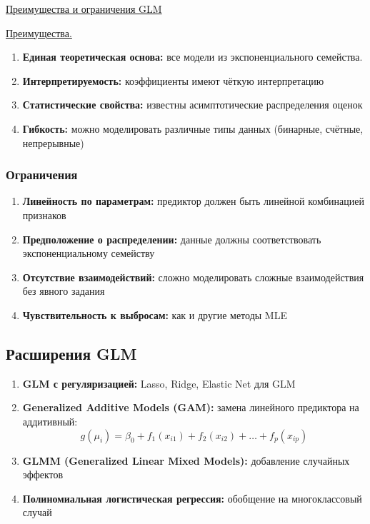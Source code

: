 \underline{Преимущества и ограничения GLM}

\underline{Преимущества.}

\begin{enumerate}
    \item \textbf{Единая теоретическая основа:} все модели из экспоненциального семейства.
    \item \textbf{Интерпретируемость:} коэффициенты имеют чёткую интерпретацию
    \item \textbf{Статистические свойства:} известны асимптотические распределения оценок
    \item \textbf{Гибкость:} можно моделировать различные типы данных (бинарные, счётные, непрерывные)
\end{enumerate}

\subsubsection*{Ограничения}

\begin{enumerate}
    \item \textbf{Линейность по параметрам:} предиктор должен быть линейной комбинацией признаков
    \item \textbf{Предположение о распределении:} данные должны соответствовать экспоненциальному семейству
    \item \textbf{Отсутствие взаимодействий:} сложно моделировать сложные взаимодействия без явного задания
    \item \textbf{Чувствительность к выбросам:} как и другие методы MLE
\end{enumerate}

\subsection*{Расширения GLM}

\begin{enumerate}
    \item \textbf{GLM с регуляризацией:} Lasso, Ridge, Elastic Net для GLM
    \item \textbf{Generalized Additive Models (GAM):} замена линейного предиктора на аддитивный:
    \[ g(\mu_i) = \beta_0 + f_1(x_{i1}) + f_2(x_{i2}) + \dots + f_p(x_{ip}) \]
    \item \textbf{GLMM (Generalized Linear Mixed Models):} добавление случайных эффектов
    \item \textbf{Полиномиальная логистическая регрессия:} обобщение на многоклассовый случай
\end{enumerate}